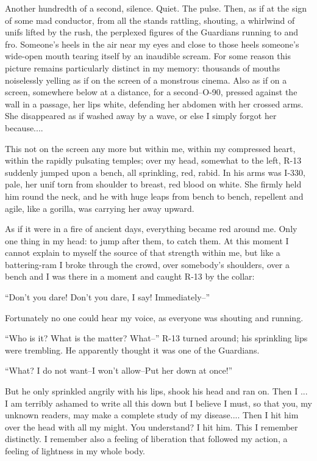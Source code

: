 \documentclass[11pt,openany]{book}
\begin{document}
Another hundredth of a second, silence. Quiet. The pulse. Then, as if at the sign of some mad conductor, from all the stands rattling, shouting, a whirlwind of unifs lifted by the rush, the perplexed figures of the Guardians running to and fro. Someone's heels in the air near my eyes and close to those heels someone's wide-open mouth tearing itself by an inaudible scream. For some reason this picture remains particularly distinct in my memory: thousands of mouths noiselessly yelling as if on the screen of a monstrous cinema. Also as if on a screen, somewhere below at a distance, for a second--O-90, pressed against the wall in a passage, her lips white, defending her abdomen with her crossed arms. She disappeared as if washed away by a wave, or else I simply forgot her because....

This not on the screen any more but within me, within my compressed heart, within the rapidly pulsating temples; over my head, somewhat to the left, R-13 suddenly jumped upon a bench, all sprinkling, red, rabid. In his arms was I-330, pale, her unif torn from shoulder to breast, red blood on white. She firmly held him round the neck, and he with huge leaps from bench to bench, repellent and agile, like a gorilla, was carrying her away upward.

As if it were in a fire of ancient days, everything became red around me. Only one thing in my head: to jump after them, to catch them. At this moment I cannot explain to myself the source of that strength within me, but like a battering-ram I broke through the crowd, over somebody's shoulders, over a bench and I was there in a moment and caught R-13 by the collar:

``Don't you dare! Don't you dare, I say! Immediately--''

Fortunately no one could hear my voice, as everyone was shouting and running.

``Who is it? What is the matter? What--'' R-13 turned around; his sprinkling lips were trembling. He apparently thought it was one of the Guardians.

``What? I do not want--I won't allow--Put her down at once!''

But he only sprinkled angrily with his lips, shook his head and ran on. Then I ... I am terribly ashamed to write all this down but I believe I must, so that you, my unknown readers, may make a complete study of my disease.... Then I hit him over the head with all my might. You understand? I hit him. This I remember distinctly. I remember also a feeling of liberation that followed my action, a feeling of lightness in my whole body.
\end{document}
